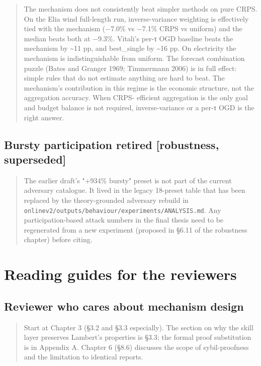 \documentclass[11pt,a4paper,openany]{report}
\begin{document}
\begin{quote}
The mechanism does not consistently beat simpler methods on pure
CRPS. On the Elia wind full-length run, inverse-variance weighting
is effectively tied with the mechanism (−7.0\% vs −7.1\% CRPS vs
uniform) and the median beats both at −9.3\%. Vitali's per-τ OGD
baseline beats the mechanism by \textasciitilde{}11 pp, and best\_single by \textasciitilde{}16 pp.
On electricity the mechanism is indistinguishable from uniform. The
forecast combination puzzle (Bates and Granger 1969; Timmermann
2006) is in full effect: simple rules that do not estimate anything
are hard to beat. The mechanism's contribution in this regime is
the economic structure, not the aggregation accuracy. When CRPS-
efficient aggregation is the only goal and budget balance is not
required, inverse-variance or a per-τ OGD is the right answer.

\end{quote}
\subsection{Bursty participation retired [robustness, superseded]}

\begin{quote}
The earlier draft's "+934\% bursty" preset is not part of the
current adversary catalogue. It lived in the legacy 18-preset
table that has been replaced by the theory-grounded adversary
rebuild in \texttt{onlinev2/outputs/behaviour/experiments/ANALYSIS.md}.
Any participation-based attack numbers in the final thesis need
to be regenerated from a new experiment (proposed in §6.11 of the
robustness chapter) before citing.

\end{quote}
\section{Reading guides for the reviewers}

\subsection{Reviewer who cares about mechanism design}

\begin{quote}
Start at Chapter 3 (§3.2 and §3.3 especially). The section on why
the skill layer preserves Lambert's properties is §3.3; the formal
proof substitution is in Appendix A. Chapter 6 (§8.6) discusses the
scope of sybil-proofness and the limitation to identical reports.

\end{quote}
\end{document}
